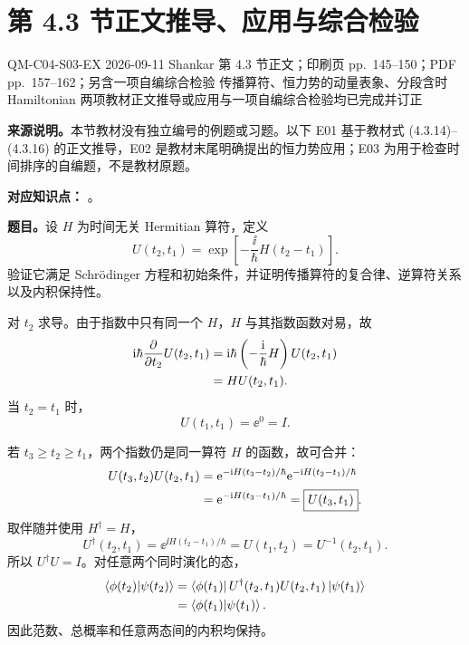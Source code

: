 \section{第 4.3 节正文推导、应用与综合检验}
\label{exercise-set:QM-C04-S03}

\exercisemeta
  {QM-C04-S03-EX}
  {2026-09-11}
  {Shankar 第 4.3 节正文；印刷页 pp.~145--150；PDF pp.~157--162；另含一项自编综合检验}
  {传播算符、恒力势的动量表象、分段含时 Hamiltonian}
  {两项教材正文推导或应用与一项自编综合检验均已完成并订正}

\textbf{来源说明。}本节教材没有独立编号的例题或习题。以下 E01 基于教材式 (4.3.14)--(4.3.16) 的正文推导，E02 是教材末尾明确提出的恒力势应用；E03 为用于检查时间排序的自编题，不是教材原题。


\textbf{对应知识点：}
。

\textbf{题目。}设 $H$ 为时间无关 Hermitian 算符，定义
\begin{equation}
  U(t_2,t_1)=\exp\left[-\frac{\ii}{\hbar}H(t_2-t_1)\right].
  \label{eq:QM-C04-S03-E01-definition}
\end{equation}
验证它满足 Schrödinger 方程和初始条件，并证明传播算符的复合律、逆算符关系以及内积保持性。

\begin{checkedsolution}
对 $t_2$ 求导。由于指数中只有同一个 $H$，$H$ 与其指数函数对易，故
\begin{align}
  \mathrm{i}\hbar\frac{\partial}{\partial t_2}U(t_2,t_1)
  &=\mathrm{i}\hbar\left(-\frac{\mathrm{i}}{\hbar}H\right)
    U(t_2,t_1)\notag\\
  &=HU(t_2,t_1).
  \label{eq:QM-C04-S03-E01-evolution-equation}
\end{align}
当 $t_2=t_1$ 时，
\begin{equation}
  U(t_1,t_1)=\ee^0=I.
  \label{eq:QM-C04-S03-E01-initial-condition}
\end{equation}

若 $t_3\ge t_2\ge t_1$，两个指数仍是同一算符 $H$ 的函数，故可合并：
\begin{align}
  U(t_3,t_2)U(t_2,t_1)
  &=\mathrm{e}^{-\mathrm{i} H(t_3-t_2)/\hbar}
    \mathrm{e}^{-\mathrm{i} H(t_2-t_1)/\hbar}\notag\\
  &=\mathrm{e}^{-\mathrm{i} H(t_3-t_1)/\hbar}
   =\boxed{U(t_3,t_1)}.
  \label{eq:QM-C04-S03-E01-composition}
\end{align}
取伴随并使用 $H^\dagger=H$，
\begin{equation}
  U^\dagger(t_2,t_1)
  =\ee^{\ii H(t_2-t_1)/\hbar}
  =U(t_1,t_2)=U^{-1}(t_2,t_1).
  \label{eq:QM-C04-S03-E01-adjoint-inverse}
\end{equation}
所以 $U^\dagger U=I$。对任意两个同时演化的态，
\begin{align}
  \left\langle \phi(t_2) \middle| \psi(t_2) \right\rangle
  &=\left\langle \phi(t_1)\right|U^\dagger(t_2,t_1)
    U(t_2,t_1)\left|\psi(t_1)\right\rangle\notag\\
  &=\left\langle \phi(t_1) \middle| \psi(t_1) \right\rangle.
  \label{eq:QM-C04-S03-E01-inner-product}
\end{align}
因此范数、总概率和任意两态间的内积均保持。
\end{checkedsolution}

